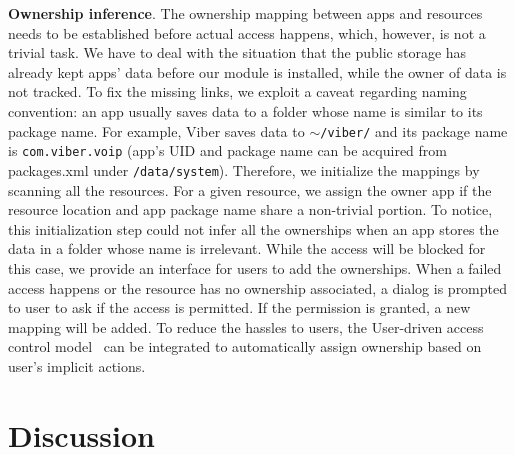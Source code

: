 \documentclass{sig-alternate}
\begin{document}
\noindent\textbf{Ownership inference}. The ownership mapping between apps and resources needs to be established before actual access happens, which, however, is not a trivial task. We have to deal with the situation that the public storage has already kept apps' data before our module is installed, while the owner of data is not tracked. To fix the missing links, we exploit a caveat regarding naming convention: an app usually saves data to a folder whose name is similar to its package name. For example, Viber saves data to \texttt{$\sim$/viber/} and its package name is \texttt{com.viber.voip} (app's UID and package name can be acquired from packages.xml under \texttt{/data/system}). Therefore, we initialize the mappings by scanning all the resources. For a given resource, we assign the owner app if the resource location and app package name share a non-trivial portion. To notice, this initialization step could not infer all the ownerships when an app stores the data in a folder whose name is irrelevant. While the access will be blocked for this case, we provide an interface for users to add the ownerships. When a failed access happens or the resource has no ownership associated, a dialog is prompted to user to ask if the access is permitted. If the permission is granted, a new mapping will be added. To reduce the hassles to users, the User-driven access control model~\cite{roesner2012user} can be integrated to automatically assign ownership based on user's implicit actions.


\section{Discussion}
\label{sec:discussion}
\end{document}
